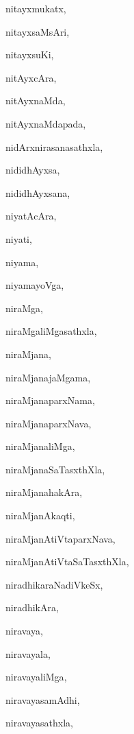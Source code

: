 \begin{multicols}{2}
{nitayxmukatx}, \pageref{nitayxmukatx}

{nitayxsaMsAri}, \pageref{nitayxsaMsAri}

{nitayxsuKi}, \pageref{nitayxsuKi}

{nitAyxcAra}, \pageref{nitAyxcAra}

{nitAyxnaMda}, \pageref{nitAyxnaMda}

{nitAyxnaMdapada}, \pageref{nitAyxnaMdapada}

{nidArxnirasanasathxla}, \pageref{nidArxnirasanasathxla}

{nididhAyxsa}, \pageref{nididhAyxsa}

{nididhAyxsana}, \pageref{nididhAyxsana}

{niyatAcAra}, \pageref{niyatAcAra}

{niyati}, \pageref{niyati}

{niyama}, \pageref{niyama}

{niyamayoVga}, \pageref{niyamayoVga}

{niraMga}, \pageref{niraMga}

{niraMgaliMgasathxla}, \pageref{niraMgaliMgasathxla}

{niraMjana}, \pageref{niraMjana}

{niraMjanajaMgama}, \pageref{niraMjanajaMgama}

{niraMjanaparxNama}, \pageref{niraMjanaparxNama}

{niraMjanaparxNava}, \pageref{niraMjanaparxNava}

{niraMjanaliMga}, \pageref{niraMjanaliMga}

{niraMjanaSaTasxthXla}, \pageref{niraMjanaSaTasxthXla}

{niraMjanahakAra}, \pageref{niraMjanahakAra}

{niraMjanAkaqti}, \pageref{niraMjanAkaqti}

{niraMjanAtiVtaparxNava}, \pageref{niraMjanAtiVtaparxNava}

{niraMjanAtiVtaSaTasxthXla}, \pageref{niraMjanAtiVtaSaTasxthXla}

{niradhikaraNadiVkeSx}, \pageref{niradhikaraNadiVkeSx}

{niradhikAra}, \pageref{niradhikAra}

{niravaya}, \pageref{niravaya}

{niravayala}, \pageref{niravayala}

{niravayaliMga}, \pageref{niravayaliMga}

{niravayasamAdhi}, \pageref{niravayasamAdhi}

{niravayasathxla}, \pageref{niravayasathxla}


\end{multicols}
